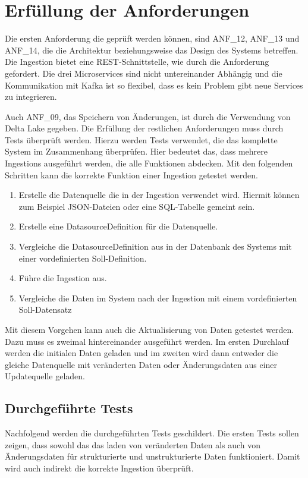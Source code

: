 \section{Erfüllung der Anforderungen}

Die ersten Anforderung die geprüft werden können, sind ANF\_12, ANF\_13 und ANF\_14, die die Architektur beziehungsweise das Design des Systems betreffen.
Die Ingestion bietet eine REST-Schnittstelle, wie durch die Anforderung gefordert.
Die drei Microservices sind nicht untereinander Abhängig und die Kommunikation mit Kafka ist so flexibel, dass es kein Problem gibt neue Services zu integrieren.

Auch ANF\_09, das Speichern von Änderungen, ist durch die Verwendung von Delta Lake gegeben.
Die Erfüllung der restlichen Anforderungen muss durch Tests überprüft werden.
Hierzu werden Tests verwendet, die das komplette System im Zusammenhang überprüfen.
Hier bedeutet das, dass mehrere Ingestions ausgeführt werden, die alle Funktionen abdecken.
Mit den folgenden Schritten kann die korrekte Funktion einer Ingestion getestet werden. \begin{enumerate}
    \item Erstelle die Datenquelle die in der Ingestion verwendet wird. 
    Hiermit können zum Beispiel JSON-Dateien oder eine SQL-Tabelle gemeint sein.
    \item Erstelle eine DatasourceDefinition für die Datenquelle.
    \item Vergleiche die DatasourceDefinition aus in der Datenbank des Systems mit einer vordefinierten Soll-Definition.
    \item Führe die Ingestion aus.
    \item Vergleiche die Daten im System nach der Ingestion mit einem vordefinierten Soll-Datensatz
\end{enumerate}
Mit diesem Vorgehen kann auch die Aktualisierung von Daten getestet werden.
Dazu muss es zweimal hintereinander ausgeführt werden.
Im ersten Durchlauf werden die initialen Daten geladen und im zweiten wird dann entweder die gleiche Datenquelle mit veränderten Daten oder Änderungsdaten aus einer Updatequelle geladen.

\subsection{Durchgeführte Tests}
\label{sec:tests-actual}
Nachfolgend werden die durchgeführten Tests geschildert.
Die ersten Tests sollen zeigen, dass sowohl das das laden von veränderten Daten als auch von Änderungsdaten für strukturierte und unstrukturierte Daten funktioniert.
Damit wird auch indirekt die korrekte Ingestion überprüft.


